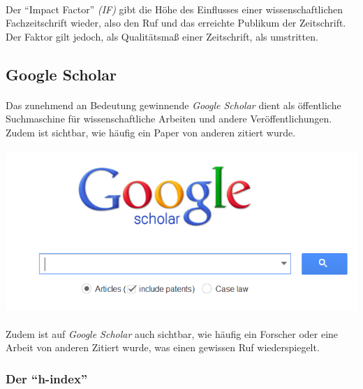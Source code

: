 \documentclass[10pt, a4paper]{article}
\begin{document}
\paragraph{}
Der \enquote{Impact Factor} \textit{(IF)} gibt die Höhe des Einflusses einer wissenschaftlichen Fachzeitschrift wieder, also den Ruf und das erreichte Publikum der Zeitschrift. Der Faktor gilt jedoch, als Qualitätsmaß einer Zeitschrift, als umstritten.\par

\subsection{Google Scholar}
\paragraph{}
Das zunehmend an Bedeutung gewinnende \textit{Google Scholar} dient als öffentliche Suchmaschine für wissenschaftliche Arbeiten und andere Veröffentlichungen. Zudem ist sichtbar, wie häufig ein Paper von anderen zitiert wurde.\par
\paragraph{}
\begin{center}
\includegraphics[scale=0.6]{GS1.png}
\end{center}\par
\paragraph{}
Zudem ist auf \textit{Google Scholar} auch sichtbar, wie häufig ein Forscher oder eine Arbeit von anderen Zitiert wurde, was einen gewissen Ruf wiederspiegelt.\par


\subsubsection{Der \enquote{h-index}}
\end{document}
